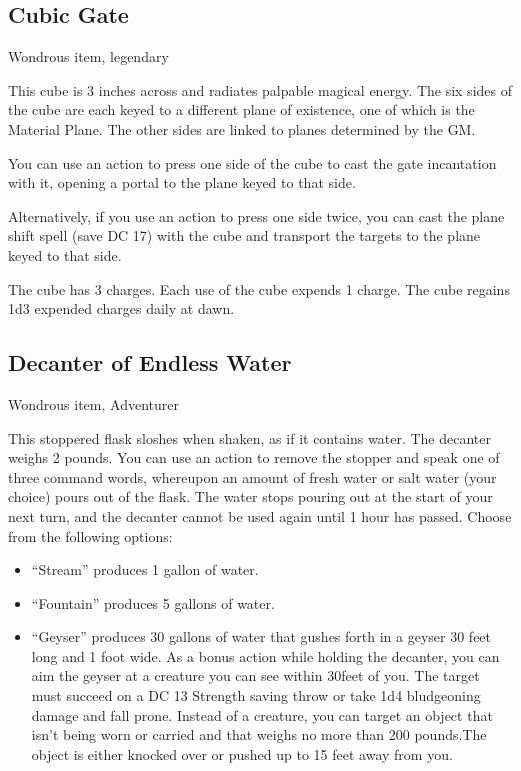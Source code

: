 \subsection{Cubic Gate}
Wondrous item, legendary

This cube is 3 inches across and radiates palpable magical energy. The six sides of the cube are each keyed to a different plane of existence, one of which is the Material Plane. The other sides are linked to planes determined by the GM.

You can use an action to press one side of the cube to cast the gate incantation with it, opening a portal to the plane keyed to that side. 

Alternatively, if you use an action to press one side twice, you can cast the plane shift spell (save DC 17) with the cube and transport the targets to the plane keyed to that side.

The cube has 3 charges. Each use of the cube expends 1 charge. The cube regains 1d3 expended charges daily at dawn.

\subsection{Decanter of Endless Water}
Wondrous item, Adventurer 

This stoppered flask sloshes when shaken, as if it contains water. The decanter weighs 2 pounds.  You can use an action to remove the stopper and speak one of three command words, whereupon an amount of fresh water or salt water (your choice) pours out of the flask. The water stops pouring out at the start of your next turn, and the decanter cannot be used again until 1 hour has passed. Choose from the following options:
\begin{itemize}
\item “Stream” produces 1 gallon of water.
\item “Fountain” produces 5 gallons of water.
\item “Geyser” produces 30 gallons of water that gushes forth in a geyser 30 feet long and 1 foot wide. As a bonus action while holding the decanter, you can aim the geyser at a creature you can see within 30feet of you. The target must succeed on a DC 13 Strength saving throw or take 1d4 bludgeoning damage and fall prone. Instead of a creature, you can target an object that isn't being worn or carried and that weighs no more than 200 pounds.The object is either knocked over or pushed up to 15 feet away from you.
\end{itemize}

